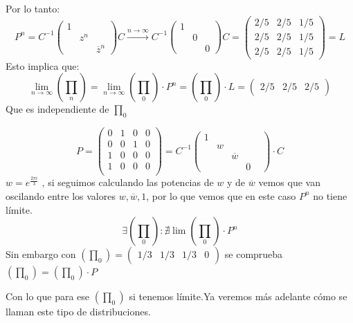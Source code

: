 \begin{example}[1]{}
	Por lo tanto:
	$$P^n =  C^{-1} \left(\begin{matrix}
	1&&\\
	&z^n&\\
	&&\overline{z}^n
	\end{matrix}\right) C \stackrel{n\rightarrow \infty}{\rightarrow}  C^{-1} \left(\begin{matrix}
	1&&\\
	&0&\\
	&&0
	\end{matrix}\right) C = \left(\begin{matrix}
	2/5&2/5&1/5\\
	2/5&2/5&1/5\\
	2/5&2/5&1/5
	\end{matrix}\right) = L$$
	Esto implica que:
	$$\lim_{n\rightarrow\infty}(\prod_n) = \lim_{n\rightarrow\infty}(\prod_0)\cdot P^n = (\prod_0)\cdot L =( \begin{matrix}
	2/5&2/5&2/5
	\end{matrix})$$
	Que es independiente de $\prod_0$
\end{example}

\begin{example}[2]
	
	\begin{center}
		\centering
	\end{center}
	
	$$P = \left( \begin{matrix}
	0 & 1 & 0 & 0\\
	0 & 0 & 1 & 0\\
	1 & 0 & 0 & 0\\
	1 & 0 & 0 & 0\\
	\end{matrix}\right)= C^{-1} \left(\begin{matrix}
	1&&&&\\
	&w&&&\\
	&&\overline{w}&\\
	&&&0
	\end{matrix}
	\right)\cdot C$$
	$w = e^{\frac{2\pi i}{3}}$ , si seguimos calculando las potencias de $w$ y de $\overline{w}$ vemos que van oscilando entre los valores $w , \overline{w} , 1$, por lo que vemos que en este caso $P^n$ no tiene límite.
	$$\exists(\prod_0) : \nexists \lim (\prod_0)\cdot P^n$$
	Sin embargo con $(\prod_0) = (\begin{matrix}
	1/3&1/3&1/3&0
	\end{matrix}) $ se comprueba $(\prod_0) = (\prod_0)\cdot P$
	
	
	Con lo que para ese $(\prod_0)$ si tenemos límite.Ya veremos más adelante cómo se llaman este tipo de distribuciones.
\end{example}

